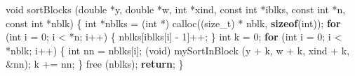 \documentclass[12pt,]{article}
\newenvironment{Shaded}{\begin{snugshade}}{\end{snugshade}}
\newcommand{\KeywordTok}[1]{\textcolor[rgb]{0.13,0.29,0.53}{\textbf{{#1}}}}
\newcommand{\DataTypeTok}[1]{\textcolor[rgb]{0.13,0.29,0.53}{{#1}}}
\newcommand{\DecValTok}[1]{\textcolor[rgb]{0.00,0.00,0.81}{{#1}}}
\newcommand{\NormalTok}[1]{{#1}}
\begin{document}
\begin{Shaded}
\begin{Highlighting}[]
\DataTypeTok{void} \NormalTok{sortBlocks (}\DataTypeTok{double} \NormalTok{*y, }\DataTypeTok{double} \NormalTok{*w, }\DataTypeTok{int} \NormalTok{*xind, }\DataTypeTok{const} \DataTypeTok{int} \NormalTok{*iblks, }\DataTypeTok{const} \DataTypeTok{int} \NormalTok{*n, }\DataTypeTok{const} \DataTypeTok{int} \NormalTok{*nblk) \{}
    \DataTypeTok{int} \NormalTok{*nblks = (}\DataTypeTok{int} \NormalTok{*) calloc((size_t) * nblk, }\KeywordTok{sizeof}\NormalTok{(}\DataTypeTok{int}\NormalTok{));}
    \KeywordTok{for} \NormalTok{(}\DataTypeTok{int} \NormalTok{i = }\DecValTok{0}\NormalTok{; i < *n; i++) \{}
        \NormalTok{nblks[iblks[i] - }\DecValTok{1}\NormalTok{]++;}
    \NormalTok{\}}
    \DataTypeTok{int} \NormalTok{k = }\DecValTok{0}\NormalTok{;}
    \KeywordTok{for} \NormalTok{(}\DataTypeTok{int} \NormalTok{i = }\DecValTok{0}\NormalTok{; i < *nblk; i++) \{}
        \DataTypeTok{int} \NormalTok{nn = nblks[i];}
        \NormalTok{(}\DataTypeTok{void}\NormalTok{) mySortInBlock (y + k, w + k, xind + k, &nn);}
        \NormalTok{k += nn;}
    \NormalTok{\}}
    \NormalTok{free (nblks);}
    \KeywordTok{return}\NormalTok{;}
\NormalTok{\}}


\end{Highlighting}
\end{Shaded}
\end{document}
